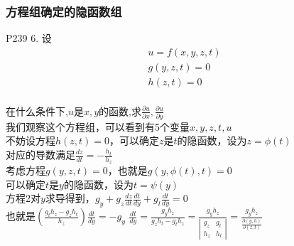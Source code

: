 \documentclass[xetex]{beamer}
\begin{document}
\begin{frame}
\frametitle{方程组确定的隐函数组}
	P239 6.
	设$$
	\begin{matrix}
		u=f(x,y,z,t)\\
		g(y,z,t)=0\\
		h(z,t)=0
	\end{matrix}
	$$\\
	在什么条件下,$u$是$x,y$的函数,求$\frac{\partial u}{\partial x},\frac{\partial u}{\partial y}$\\ \pause
	我们观察这个方程组，可以看到有5个变量$x,y,z,t,u$\\ 
	不妨设方程$h(z,t)=0$，可以确定$z$是$t$的隐函数，设为$z=\phi(t)$\\ \pause
	对应的导数满足$\frac{dz}{dt}=-\frac{h_t}{h_z}$\\ \pause
	考虑方程$g(y,z,t)=0$，也就是$g(y,\phi(t),t)=0$\\
	可以确定$t$是$y$的隐函数，设为$t=\psi(y)$\\
	方程2对$y$求导得到，$g_y+g_z\frac{dz}{dt}\frac{dt}{dy}+g_t\frac{dt}{dy}=0$\\ \pause
	也就是$(\frac{g_t h_z-g_z h_t}{h_z})\frac{dt}{dy}=-g_y$ \quad
	$\frac{dt}{dy}=\frac{g_y h_z}{g_z h_t-g_t h_z}=\frac{g_y h_z}{
	\left|
		\begin{matrix}
			g_z & g_t\\
			h_z & h_t
		\end{matrix}
	\right|
	}=\frac{g_y h_z}{\frac{\partial (g,h)}{\partial (z,t)}}$\\

	
\end{frame}
\end{document}
